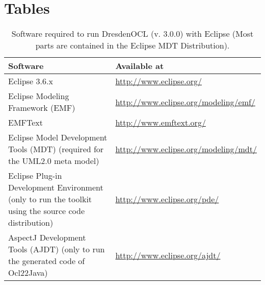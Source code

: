 \cleardoublepage
{}
{}
\chapter*{Tables}


\begin{table}[h]
\begin{tabular}{|p{7cm}|p{7cm}|}
    \hline
    \textbf{Software} & \textbf{Available at} \\
    \hline
    Eclipse 3.6.x & \url{http://www.eclipse.org/} \\
    \hline
    Eclipse Modeling Framework (EMF) & \url{http://www.eclipse.org/modeling/emf/} \\
    \hline
    EMFText & \url{http://www.emftext.org/} \\
    \hline
    Eclipse Model Development Tools (MDT) 
    \newline\footnotesize(required for the UML2.0 meta model) &
    \url{http://www.eclipse.org/modeling/mdt/} \\
    \hline
    Eclipse Plug-in Development Environment 
    \newline\footnotesize(only to run the toolkit using the source code
    distribution) & \url{http://www.eclipse.org/pde/} \\
    \hline
    AspectJ Development Tools (AJDT) 
    \newline\footnotesize(only to run the generated code of Ocl22Java) &
    \url{http://www.eclipse.org/ajdt/} \\
    \hline
\end{tabular}
\caption{Software required to run DresdenOCL (v. 3.0.0) with Eclipse \newline(Most parts are con\-tained in the Eclipse MDT Distribution).}
\label{tab:software}
\end{table}


